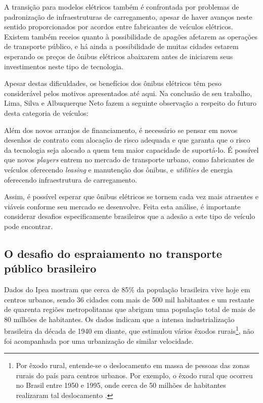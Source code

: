 A transição para modelos elétricos também é confrontada por problemas de padronização de infraestruturas de carregamento, apesar de haver avanços neste sentido proporcionados por acordos entre fabricantes de veículos elétricos. Existem também receios quanto à possibilidade de apagões afetarem as operações de transporte público, e há ainda a possibilidade de muitas cidades estarem esperando os preços de ônibus elétricos abaixarem antes de iniciarem seus investimentos neste tipo de tecnologia.

Apesar destas dificuldades, os benefícios dos ônibus elétricos têm peso considerável pelos motivos apresentados até aqui. Na conclusão de seu trabalho, Lima, Silva e Albuquerque Neto fazem a seguinte observação a respeito do futuro desta categoria de veículos:

\begin{displayquote}
    \textelp{} Além dos novos arranjos de financiamento, é necessário se pensar em novos desenhos de contrato com alocação de risco adequada e que garanta que o risco da tecnologia seja alocado a quem tem maior capacidade de suportá-lo. É possível que novos \emph{players} entrem no mercado de transporte urbano, como fabricantes de veículos oferecendo \emph{leasing} e manutenção dos ônibus, e \emph{utilities} de energia oferecendo infraestrutura de carregamento.
\end{displayquote}

Assim, é possível esperar que ônibus elétricos se tornem cada vez mais atraentes e viáveis conforme seu mercado se desenvolve. Feita esta análise, é importante considerar desafios especificamente brasileiros que a adesão a este tipo de veículo pode encontrar.

\subsection{O desafio do espraiamento no transporte público brasileiro}
Dados do Ipea \cite{IPEA:16} mostram que cerca de 85\% da população brasileira vive hoje em centros urbanos, sendo 36 cidades com mais de 500 mil habitantes e um restante de quarenta regiões metropolitanas que abrigam uma população total de mais de 80 milhões de habitantes. Os dados indicam que a intensa industrialização brasileira da década de 1940 em diante, que estimulou vários êxodos rurais\footnote{Por êxodo rural, entende-se o deslocamento em massa de pessoas das zonas rurais do país para centros urbanos. Por exemplo, o êxodo rural que ocorreu no Brasil entre 1950 e 1995, onde cerca de 50 milhões de habitantes realizaram tal deslocamento \cite{IPEA:00}.}, não foi acompanhada por uma urbanização de similar velocidade.

